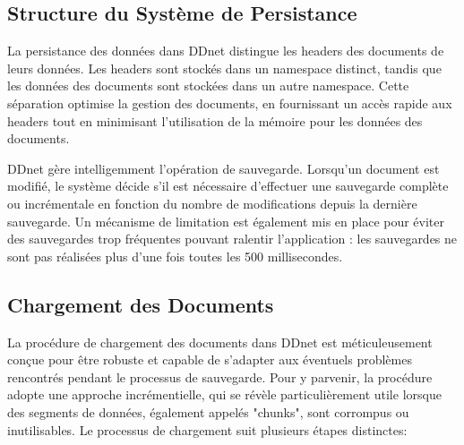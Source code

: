 \subsection{Structure du Système de Persistance}

La persistance des données dans DDnet distingue les headers des documents de leurs données. Les headers sont stockés dans un namespace distinct, tandis que les données des documents sont stockées dans un autre namespace. Cette séparation optimise la gestion des documents, en fournissant un accès rapide aux headers tout en minimisant l'utilisation de la mémoire pour les données des documents.

DDnet gère intelligemment l'opération de sauvegarde. Lorsqu'un document est modifié, le système décide s'il est nécessaire d'effectuer une sauvegarde complète ou incrémentale en fonction du nombre de modifications depuis la dernière sauvegarde. Un mécanisme de limitation est également mis en place pour éviter des sauvegardes trop fréquentes pouvant ralentir l'application : les sauvegardes ne sont pas réalisées plus d'une fois toutes les 500 millisecondes.

\subsection{Chargement des Documents}

La procédure de chargement des documents dans DDnet est méticuleusement conçue pour être robuste et capable de s'adapter aux éventuels problèmes rencontrés pendant le processus de sauvegarde. Pour y parvenir, la procédure adopte une approche incrémentielle, qui se révèle particulièrement utile lorsque des segments de données, également appelés "chunks", sont corrompus ou inutilisables. Le processus de chargement suit plusieurs étapes distinctes:

